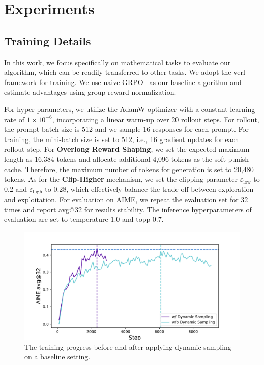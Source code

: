 
\section{Experiments}

\subsection{Training Details}
\label{sec:train_detail}

In this work, we focus specifically on mathematical tasks to evaluate our algorithm, which can be readily transferred to other tasks. We adopt the verl framework \cite{sheng2024hybridflow} for training. We use naive GRPO~\cite{deepseekmath} as our baseline algorithm and estimate advantages using group reward normalization.

For hyper-parameters, we utilize the AdamW \cite{loshchilov2018decoupled} optimizer with a constant learning rate of \(1 \times 10^{-6}\), incorporating a linear warm-up over 20 rollout steps.
For rollout, the prompt batch size is 512 and we sample 16 responses for each prompt. For training, the mini-batch size is set to 512, i.e., 16 gradient updates for each rollout step. For \textbf{Overlong Reward Shaping}, we set the expected maximum length as 16,384 tokens and allocate additional 4,096 tokens as the soft punish cache. Therefore, the maximum number of tokens for generation is set to 20,480 tokens. 
As for the \textbf{Clip-Higher} mechanism, we set the clipping parameter \(\varepsilon_{\text{low}}\) to 0.2 and \(\varepsilon_{\text{high}}\) to 0.28, which effectively balance the trade-off between exploration and exploitation.
For evaluation on AIME, we repeat the evaluation set for 32 times and report avg@32 for results stability. The inference hyperparameters of evaluation are set to temperature 1.0 and topp 0.7.

\begin{figure}[t]
    \centering
    \includegraphics[width=0.7\linewidth]{figures/4.1.1.pdf}
    \caption{The training progress before and after applying dynamic sampling on a baseline setting.}
    \label{fig:afos_compare}
\end{figure}


